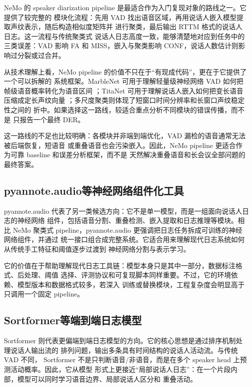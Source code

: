 \documentclass[UTF8,a4paper,10pt]{ctexart}
\begin{document}
NeMo 的 speaker diarization pipeline 是最适合作为入门复现对象的路线之一。它提供了较完整的
模块化流程：先用 VAD 找出语音区域，再用说话人嵌入模型提取声纹表示，随后构造相似度矩阵并
进行聚类，最后输出 RTTM 格式的说话人日志\cite{kuchaiev2019nemo}。这一流程与传统聚类式
说话人日志高度一致，能够清楚地对应到任务中的三类误差：VAD 影响 FA 和 MISS，嵌入与聚类影响
CONF，说话人数估计则影响过分裂或过合并。

从技术理解上看，NeMo pipeline 的价值不只在于“有现成代码”，更在于它提供了一个可以拆解的
系统框架。MarbleNet 可用于理解轻量级神经网络 VAD 如何把帧级语音概率转化为语音区间
\cite{jia2021marblenet}；TitaNet 可用于理解说话人嵌入如何把变长语音压缩成定长声纹向量
\cite{koluguri2022titanet}；多尺度聚类则体现了短窗口时间分辨率和长窗口声纹稳定性之间的
折中\cite{park2022multiscale}。如果选择这一路线，较适合重点分析不同模块的错误传播，而不是
只报告一个最终 DER。

这一路线的不足也比较明确：各模块并非端到端优化，VAD 漏检的语音通常无法被后端恢复，短语音
或重叠语音也会污染嵌入。因此，NeMo pipeline 更适合作为可靠 baseline 和误差分析框架，而不是
天然解决重叠语音和长会议全部问题的最终答案。

\subsection{pyannote.audio等神经网络组件化工具}

pyannote.audio 代表了另一类候选方向：它不是单一模型，而是一组面向说话人日志的神经网络
组件，包括语音分割、重叠检测、嵌入提取和日志推理等模块\cite{bredin2020pyannote}。相比
NeMo 聚类式 pipeline，pyannote.audio 更强调把日志任务拆成可训练的神经网络组件，并通过
统一接口组合成完整系统。它适合用来理解现代日志系统如何从传统手工特征和阈值逐步过渡到
神经网络分割与表示学习。

它的价值在于帮助理解现代日志工具链：模型本身只是其中一部分，数据标注格式、后处理、阈值
选择、评测协议和可复现脚本同样重要。不过，它的环境依赖、模型版本和数据格式较多，若深入
训练或替换模块，工程复杂度会明显高于只调用一个固定 pipeline。

\subsection{Sortformer等端到端日志模型}

Sortformer 则代表更偏端到端日志模型的方向。它的核心思想是通过排序机制处理说话人输出流的
排列问题，输出多条具有时间结构的说话人活动流\cite{park2024sortformer}。与传统 VAD 不同，
Sortformer 不是只判断语音/非语音，而是在多个 speaker head 上预测活动概率。因此，它从模型
形式上更接近“局部说话人日志”：在一个片段内部，模型可以同时学习语音边界、局部说话人区分和
重叠活动。
\end{document}
